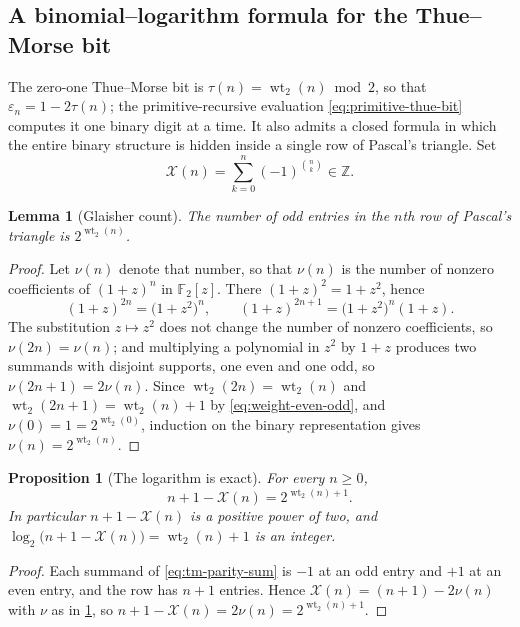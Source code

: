 \documentclass[11pt,oneside]{article}
\newtheorem{proposition}[theorem]{Proposition}
\newtheorem{lemma}[theorem]{Lemma}
\theoremstyle{definition}
\theoremstyle{remark}
\newcommand{\Z}{\mathbb Z}
\newcommand{\wt}{\operatorname{wt}_2}
\begin{document}
\subsection{A binomial--logarithm formula for the Thue--Morse bit}
\label{tm:sub-binomial-log}

The zero-one Thue--Morse bit is $\tau(n)=\wt(n)\bmod2$, so that
$\varepsilon_n=1-2\tau(n)$; the primitive-recursive evaluation
\eqref{eq:primitive-thue-bit} computes it one binary digit at a time.  It also admits a
closed formula in which the entire binary structure is hidden inside a single row of
Pascal's triangle.  Set
\begin{equation}
 \mathcal X(n)=\sum_{k=0}^{n}(-1)^{\binom nk}\in\Z.        \label{eq:tm-parity-sum}
\end{equation}

\begin{lemma}[Glaisher count]
\label{thm:tm-glaisher}
The number of odd entries in the $n$\/th row of Pascal's triangle is $2^{\wt(n)}$.
\end{lemma}

\begin{proof}
Let $\nu(n)$ denote that number, so that $\nu(n)$ is the number of nonzero coefficients of
$(1+z)^n$ in $\mathbb F_2[z]$.  There $(1+z)^2=1+z^2$, hence
\begin{equation*}
 (1+z)^{2n}=\bigl(1+z^2\bigr)^n,
 \qquad
 (1+z)^{2n+1}=\bigl(1+z^2\bigr)^n(1+z).
\end{equation*}
The substitution $z\mapsto z^2$ does not change the number of nonzero coefficients, so
$\nu(2n)=\nu(n)$; and multiplying a polynomial in $z^2$ by $1+z$ produces two summands with
disjoint supports, one even and one odd, so $\nu(2n+1)=2\nu(n)$.  Since $\wt(2n)=\wt(n)$
and $\wt(2n+1)=\wt(n)+1$ by \eqref{eq:weight-even-odd}, and $\nu(0)=1=2^{\wt(0)}$,
induction on the binary representation gives $\nu(n)=2^{\wt(n)}$.
\end{proof}

\begin{proposition}[The logarithm is exact]
\label{thm:tm-log-exact}
For every $n\ge0$,
\begin{equation}
 n+1-\mathcal X(n)=2^{\wt(n)+1}.                           \label{eq:tm-log-exact}
\end{equation}
In particular $n+1-\mathcal X(n)$ is a positive power of two, and
$\log_2\bigl(n+1-\mathcal X(n)\bigr)=\wt(n)+1$ is an integer.
\end{proposition}

\begin{proof}
Each summand of \eqref{eq:tm-parity-sum} is $-1$ at an odd entry and $+1$ at an even entry,
and the row has $n+1$ entries.  Hence $\mathcal X(n)=(n+1)-2\nu(n)$ with $\nu$ as in
\cref{thm:tm-glaisher}, so $n+1-\mathcal X(n)=2\nu(n)=2^{\wt(n)+1}$.
\end{proof}
\end{document}
